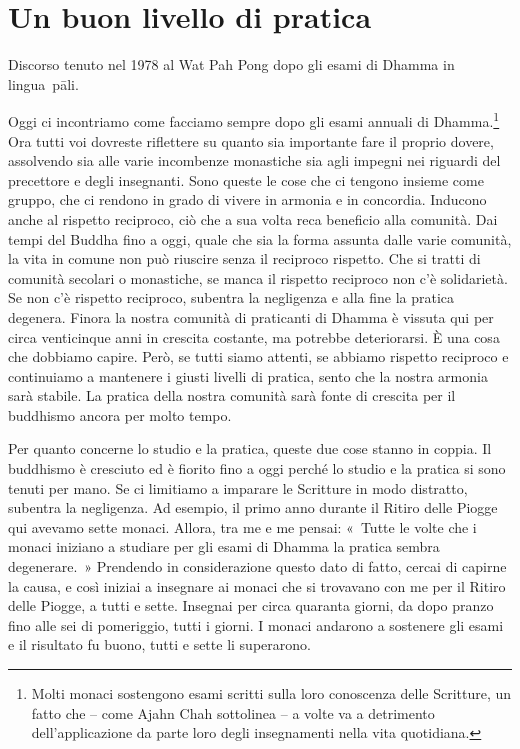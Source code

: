 \chapter{Un buon livello di pratica}

\begin{openingQuote}
  Discorso tenuto nel 1978 al Wat Pah Pong dopo gli esami di Dhamma in
  lingua~pāli.
\end{openingQuote}

Oggi ci incontriamo come facciamo sempre dopo gli esami annuali di
Dhamma.\footnote{Molti monaci sostengono esami scritti sulla loro
  conoscenza delle Scritture, un fatto che -- come Ajahn Chah sottolinea
  -- a volte va a detrimento dell'applicazione da parte loro degli
  insegnamenti nella vita quotidiana.} Ora tutti voi dovreste riflettere
su quanto sia importante fare il proprio dovere, assolvendo sia alle
varie incombenze monastiche sia agli impegni nei riguardi del precettore
e degli insegnanti. Sono queste le cose che ci tengono insieme come
gruppo, che ci rendono in grado di vivere in armonia e in concordia.
Inducono anche al rispetto reciproco, ciò che a sua volta reca beneficio
alla comunità. Dai tempi del Buddha fino a oggi, quale che sia la forma
assunta dalle varie comunità, la vita in comune non può riuscire senza
il reciproco rispetto. Che si tratti di comunità secolari o monastiche,
se manca il rispetto reciproco non c'è solidarietà. Se non c'è rispetto
reciproco, subentra la negligenza e alla fine la pratica degenera.
Finora la nostra comunità di praticanti di Dhamma è vissuta qui per
circa venticinque anni in crescita costante, ma potrebbe deteriorarsi. È
una cosa che dobbiamo capire. Però, se tutti siamo attenti, se abbiamo
rispetto reciproco e continuiamo a mantenere i giusti livelli di
pratica, sento che la nostra armonia sarà stabile. La pratica della
nostra comunità sarà fonte di crescita per il buddhismo ancora per molto
tempo.

Per quanto concerne lo studio e la pratica, queste due cose stanno in
coppia. Il buddhismo è cresciuto ed è fiorito fino a oggi perché lo
studio e la pratica si sono tenuti per mano. Se ci limitiamo a imparare
le Scritture in modo distratto, subentra la negligenza. Ad esempio, il
primo anno durante il Ritiro delle Piogge qui avevamo sette monaci.
Allora, tra me e me pensai: «~Tutte le volte che i monaci iniziano a
studiare per gli esami di Dhamma la pratica sembra degenerare.~»
Prendendo in considerazione questo dato di fatto, cercai di capirne la
causa, e così iniziai a insegnare ai monaci che si trovavano con me per
il Ritiro delle Piogge, a tutti e sette. Insegnai per circa quaranta
giorni, da dopo pranzo fino alle sei di pomeriggio, tutti i giorni. I
monaci andarono a sostenere gli esami e il risultato fu buono, tutti e
sette li superarono.

